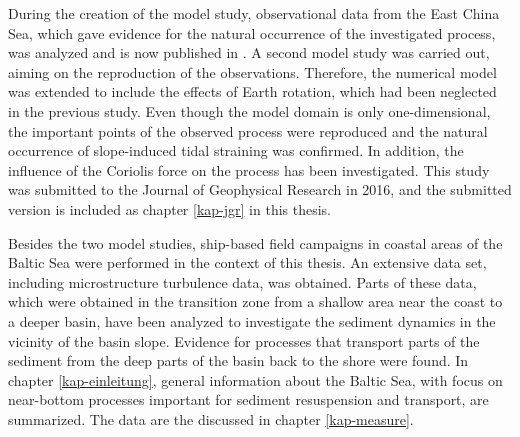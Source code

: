 During the creation of the model study, observational data from the East China 
Sea, which gave evidence for the natural occurrence of the investigated 
process, was analyzed and is now published in \cite{Endohetal2016a}. A second 
model study was carried out, aiming on the reproduction of the observations. 
Therefore, the numerical model was extended to include the effects of Earth 
rotation, which had been neglected in the previous study. Even though the model 
domain is only one-dimensional, the important points of the observed process 
were reproduced and the natural occurrence of slope-induced tidal straining was 
confirmed. In addition, the influence of the Coriolis force on the process has 
been investigated. This study was submitted to the Journal of Geophysical 
Research in 2016, and the submitted version is included as chapter 
\ref{kap-jgr} in this thesis.

Besides the two model studies, ship-based field campaigns in coastal areas of 
the Baltic Sea were performed in the context of this thesis. An extensive data 
set, including microstructure turbulence data, was obtained. Parts of these 
data, which were obtained in the transition zone from a shallow area near the 
coast to a deeper basin, have been analyzed to investigate the sediment 
dynamics in the vicinity of the basin slope. Evidence for processes that 
transport parts of the sediment from the deep parts of the basin back to the 
shore were found. In chapter \ref{kap-einleitung}, general information about 
the Baltic Sea, with focus on near-bottom processes important for sediment 
resuspension and transport, are summarized. The data are the discussed in 
chapter \ref{kap-measure}.